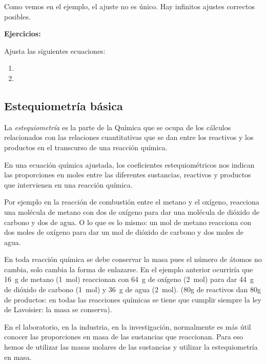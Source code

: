 \documentclass[
  spanish,
]{article}
\begin{document}
Como vemos en el ejemplo, el ajuste no es único. Hay infinitos ajustes
correctos posibles.

\textbf{Ejercicios:}

\begin{exercise}Ajusta las siguientes ecuaciones:

\begin{enumerate}
\def\labelenumi{\alph{enumi})}
\item
\item
\end{enumerate}

\end{exercise}

\hypertarget{estequiometruxeda-buxe1sica}{%
\subsection{Estequiometría básica}\label{estequiometruxeda-buxe1sica}}

La \emph{estequiometría} es la parte de la Química que se ocupa de los
cálculos relacionados con las relaciones cuantitativas que se dan entre
los reactivos y los productos en el transcurso de una reacción química.

En una ecuación química ajustada, los coeficientes estequiométricos nos
indican las proporciones en moles entre las diferentes sustancias,
reactivos y productos que intervienen en una reacción química.

Por ejemplo en la reacción de combustión entre el metano y el oxígeno,
reacciona una molécula de metano con dos de oxígeno para dar una
molécula de dióxido de carbono y dos de agua. O lo que es lo mismo: un
mol de metano reacciona con dos moles de oxígeno para dar un mol de
dióxido de carbono y dos moles de agua.

En toda reacción química se debe conservar la masa pues el número de
átomos no cambia, solo cambia la forma de enlazarse. En el ejemplo
anterior ocurriría que \qty{16}{\g} de metano (\qty{1}{\mol}) reaccionan
con \qty{64}{\g} de oxígeno (\qty{2}{\mol}) para dar \qty{44}{\g} de
dióxido de carbono (\qty{1}{\mol}) y \qty{36}{\g} de agua
(\qty{2}{\mol}). (80g de reactivos dan 80g de productos: en todas las
reacciones químicas se tiene que cumplir siempre la ley de Lavoisier: la
masa se conserva).

En el laboratorio, en la industria, en la investigación, normalmente es
más útil conocer las proporciones en masa de las sustancias que
reaccionan. Para eso hemos de utilizar las masas molares de las
sustancias y utilizar la estequiometría en masa.
\end{document}
